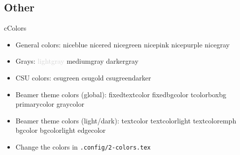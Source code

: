 \subsection*{Other}
\begin{myslide}{c}{Colors}

\begin{itemize}

\item General colors:
\textcolor{niceblue}{niceblue}
\textcolor{nicered}{nicered}
\textcolor{nicegreen}{nicegreen}
\textcolor{nicepink}{nicepink}
\textcolor{nicepurple}{nicepurple}
\textcolor{nicegray}{nicegray}

\item Grays:
\textcolor{lightgray}{lightgray}
\textcolor{mediumgray}{mediumgray}
\textcolor{darkergray}{darkergray}

\item CSU colors:
\textcolor{csugreen}{csugreen}
\textcolor{csugold}{csugold}
\textcolor{csugreendarker}{csugreendarker}


\item Beamer theme colors (global):
\textcolor{fixedtextcolor}{fixedtextcolor}
\textcolor{fixedbgcolor}{fixedbgcolor}
\textcolor{tcolorboxbg}{tcolorboxbg}
\textcolor{primarycolor}{primarycolor}
\textcolor{graycolor}{graycolor}

\item Beamer theme colors (light/dark):
\textcolor{textcolor}{textcolor}
\textcolor{textcolorlight}{textcolorlight}
\textcolor{textcoloremph}{textcoloremph}
\textcolor{bgcolor}{bgcolor}
\textcolor{bgcolorlight}{bgcolorlight}
\textcolor{edgecolor}{edgecolor}

\item Change the colors in \lstinline{.config/2-colors.tex}

\end{itemize}
\end{myslide}

